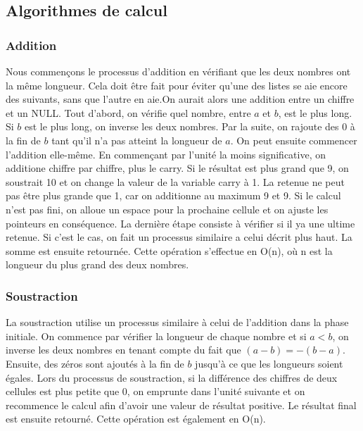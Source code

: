 \documentclass[letterpaper,12pt]{scrartcl}
\begin{document}
        \subsection{Algorithmes de calcul} \label{algos}
            
        
            \subsubsection{Addition}
             Nous commençons le processus d'addition en vérifiant que les deux nombres ont la même longueur. Cela doit être fait pour éviter qu'une des listes se aie encore des suivants, sans que l'autre en aie.On aurait alors une addition entre un chiffre et un NULL. Tout d'abord, on vérifie quel nombre, entre $a$ et $b$, est le plus long. Si $b$ est le plus long, on inverse les deux nombres. Par la suite, on rajoute des 0 à la fin de $b$ tant qu'il n'a pas atteint la longueur de $a$. On peut ensuite commencer l'addition elle-même. En commençant par l'unité la moins significative, on additione chiffre par chiffre, plus le carry. Si le résultat est plus grand que 9, on soustrait 10 et on change la valeur de la variable carry à 1. La retenue ne peut pas être plus grande que 1, car on additionne au maximum 9 et 9. Si le calcul n'est pas fini, on alloue un espace pour la prochaine cellule et on ajuste les pointeurs en conséquence. La dernière étape consiste à vérifier si il ya une ultime retenue. Si c'est le cas, on fait un processus similaire a celui décrit plus haut. La somme est ensuite retournée. Cette opération s'effectue en O(n), où n est la longueur du plus grand des deux nombres.
            
            \subsubsection{Soustraction}
             La soustraction utilise un processus similaire à celui de l'addition dans la phase initiale. On commence par vérifier la longueur de chaque nombre et si $a < b$, on inverse les deux nombres en tenant compte du fait que $(a-b) = -(b-a)$. Ensuite, des zéros sont ajoutés à la fin de $b$ jusqu'à ce que les longueurs soient égales. Lors du processus de soustraction, si la différence des chiffres de deux cellules est plus petite que 0, on emprunte dans l'unité suivante et on recommence le calcul afin d'avoir une valeur de résultat positive. Le résultat final est ensuite retourné. Cette opération est également en O(n).
            
\end{document}
